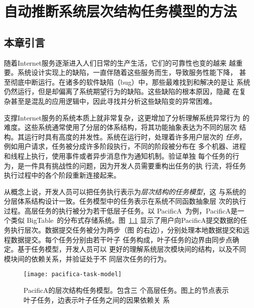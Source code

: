 \chapter{自动推断系统层次结构任务模型的方法}
\label{chap:scalpel}

\section{本章引言}

随着Internet服务逐渐进入人们日常的生产生活，它们的可靠性也变的越来
越重要。系统设计实现上的缺陷，一直伴随着这些服务而生，导致服务性能下降，
甚至彻底中断运行。在诸多的软件缺陷（bug）中，那些最难找到和解决的是让
系统仍然运行，但是却偏离了系统期望行为的缺陷。这些缺陷的根本原因，隐藏
在复杂甚至是混乱的应用逻辑中，因此寻找并分析这些缺陷变的异常困难。

支撑Internet服务的系统本质上就非常复杂，这更增加了分析理解系统异常行为
的难度。这些系统通常使用了分层的体系结构，将其功能抽象表达为不同的层次
结构。其运行时具有高度的并发性。系统在运行时，处理着许多用户层次的
\emph{任务}，例如用户请求，任务被分成许多阶段执行，不同的阶段被分布在
多个机器、进程和线程上执行，使用事件或者异步消息作为通知机制。验证单独
每个任务的行为，是一件具有挑战性的问题，因为开发人员需要重构出任务的执
行流，将任务执行过程中的各个阶段重新连接起来。

从概念上说，开发人员可以把任务执行表示为\emph{层次结构的任务模型}，这
与系统的分层体系结构设计一致。任务模型中的任务表示在系统不同函数抽象层
次的执行过程。高层任务的执行被分为若干低层子任务。以
PacificA~\cite{pacifica}为例，PacificA是一个类似
BigTable~\cite{bigtable}的分布式存储系统。图~\ref{fig:pacifica_model}
显示了用户向PacificA提交数据的任务执行层次。数据提交任务被分为两步（图
的右边），分别处理本地数据提交和远程数据提交。每个任务分别由若干{叶子
任务}构成，叶子任务的边界由{同步点}确定。基于任务模型，开发人员可以
更好的理解系统层次模块间的结构，以及不同模块间的依赖关系，并验证处于不
同层次任务的行为。

\begin{figure}
  \centering
  \begin{minipage}{1.0\linewidth}
    \centering
    \texttt{[image: pacifica-task-model]}
    \parbox{0.8\linewidth}{\caption{PacificA的层次结构任务模型。包含三
    个高层任务。图上的节点表示叶子任务，边表示叶子任务之间的因果依赖关
    系}
    \label{fig:pacifica_model}}
  \end{minipage}
\end{figure}

